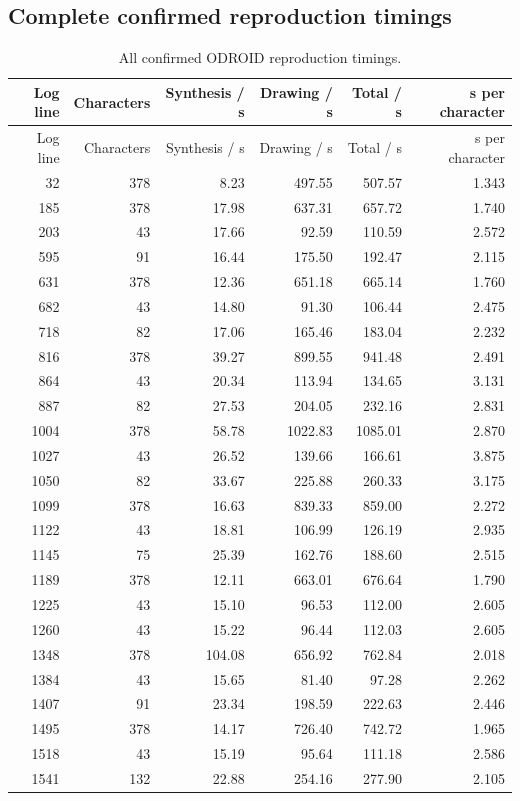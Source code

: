 \subsection{Complete confirmed reproduction timings}\label{app:res-speed}
\begin{longtable}{rrrrrr}
\caption{All confirmed ODROID reproduction timings.}\label{tab:app-complete-timings}\\
\toprule Log line & Characters & Synthesis / s & Drawing / s & Total / s & s per character\\\midrule\endfirsthead
\toprule Log line & Characters & Synthesis / s & Drawing / s & Total / s & s per character\\\midrule\endhead
32 & 378 & 8.23 & 497.55 & 507.57 & 1.343\\
185 & 378 & 17.98 & 637.31 & 657.72 & 1.740\\
203 & 43 & 17.66 & 92.59 & 110.59 & 2.572\\
595 & 91 & 16.44 & 175.50 & 192.47 & 2.115\\
631 & 378 & 12.36 & 651.18 & 665.14 & 1.760\\
682 & 43 & 14.80 & 91.30 & 106.44 & 2.475\\
718 & 82 & 17.06 & 165.46 & 183.04 & 2.232\\
816 & 378 & 39.27 & 899.55 & 941.48 & 2.491\\
864 & 43 & 20.34 & 113.94 & 134.65 & 3.131\\
887 & 82 & 27.53 & 204.05 & 232.16 & 2.831\\
1004 & 378 & 58.78 & 1022.83 & 1085.01 & 2.870\\
1027 & 43 & 26.52 & 139.66 & 166.61 & 3.875\\
1050 & 82 & 33.67 & 225.88 & 260.33 & 3.175\\
1099 & 378 & 16.63 & 839.33 & 859.00 & 2.272\\
1122 & 43 & 18.81 & 106.99 & 126.19 & 2.935\\
1145 & 75 & 25.39 & 162.76 & 188.60 & 2.515\\
1189 & 378 & 12.11 & 663.01 & 676.64 & 1.790\\
1225 & 43 & 15.10 & 96.53 & 112.00 & 2.605\\
1260 & 43 & 15.22 & 96.44 & 112.03 & 2.605\\
1348 & 378 & 104.08 & 656.92 & 762.84 & 2.018\\
1384 & 43 & 15.65 & 81.40 & 97.28 & 2.262\\
1407 & 91 & 23.34 & 198.59 & 222.63 & 2.446\\
1495 & 378 & 14.17 & 726.40 & 742.72 & 1.965\\
1518 & 43 & 15.19 & 95.64 & 111.18 & 2.586\\
1541 & 132 & 22.88 & 254.16 & 277.90 & 2.105\\
\bottomrule\end{longtable}
